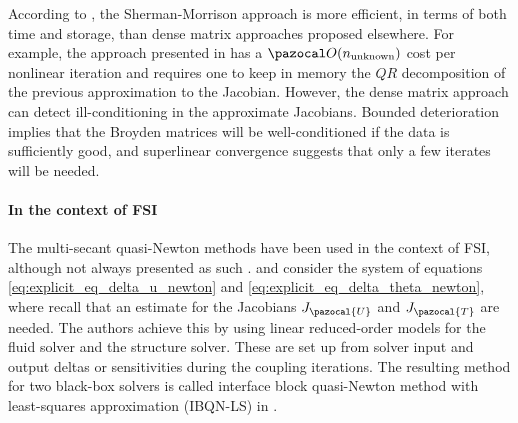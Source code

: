 According to \cite{kelley_solving_2003}, the Sherman-Morrison approach is more efficient, in terms of both time and storage, than dense matrix approaches proposed elsewhere.
For example, the approach presented in \cite{dennis_numerical_1996} has a \(\pazocal O(n_\text{unknown})\) cost per nonlinear iteration and requires one to keep in memory the \(QR\) decomposition of the previous approximation to the Jacobian.
However, the dense matrix approach can detect ill-conditioning in the approximate Jacobians.
Bounded deterioration implies that the Broyden matrices will be well-conditioned if the data is sufficiently good, and superlinear convergence suggests that only a few iterates will be needed.


\paragraph{In the context of FSI}

The multi-secant quasi-Newton methods have been used in the context of FSI, although not always presented as such \citep{haelterman_quasi-newton_2009, gatzhammer_efficient_2014, uekermann_partitioned_2016, scheufele_coupling_2018}.
 \cite{vierendeels_implicit_2007} and \cite{degroote_stability_2008} consider the system of equations \eqref{eq:explicit_eq_delta_u_newton} and \eqref{eq:explicit_eq_delta_theta_newton}, where recall that an estimate for the Jacobians \(J_\pazocal{U}\) and \(J_\pazocal{T}\) are needed.
The authors achieve this by using linear reduced-order models for the fluid solver and the structure solver.
These are set up from solver input and output deltas or sensitivities during the coupling iterations.
The resulting method for two black-box solvers is called interface block quasi-Newton method with least-squares approximation (IBQN-LS) in \cite{degroote_development_2010}.

